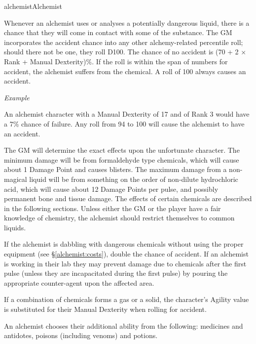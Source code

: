 \begin{Skill}[1.1]{alchemist}{Alchemist}

Whenever an alchemist uses or analyses a potentially dangerous liquid,
there is a chance that they will come in contact with some of the
substance.  The GM incorporates the accident chance into any other
alchemy-related percentile roll; should there not be one, they roll
D100.  The chance of no accident is (70 + 2 × Rank + Manual
Dexterity)\%.  If the roll is within the span of numbers for accident,
the alchemist suffers from the chemical.  A roll of 100 always causes
an accident.

\emph{Example}

An alchemist character with a Manual Dexterity of 17 and of
Rank 3 would have a 7\% chance of failure. Any roll from 94 to 100
will cause the alchemist to have an accident.

The GM will determine the exact effects upon the unfortunate
character.  The minimum damage will be from formaldehyde type
chemicals, which will cause about 1 Damage Point and causes blisters.
The maximum damage from a non-magical liquid will be from something on
the order of non-dilute hydrochloric acid, which will cause about 12
Damage Points per pulse, and possibly permanent bone and tissue
damage.  The effects of certain chemicals are described in the
following sections. Unless either the GM or the player have a fair
knowledge of chemistry, the alchemist should restrict themselves to
common liquids.

If the alchemist is dabbling with dangerous chemicals without using
the proper equipment (see \S\ref{alchemist:costs}), double the chance
of accident. If an alchemist is working in their lab they may prevent
damage due to chemicals after the first pulse (unless they are
incapacitated during the first pulse) by pouring the appropriate
counter-agent upon the affected area.

If a combination of chemicals forms a gas or a solid, the character’s
Agility value is substituted for their Manual Dexterity when rolling
for accident.


An alchemist chooses their additional ability from the following:
medicines and antidotes, poisons (including venoms) and potions.



\end{Skill}
